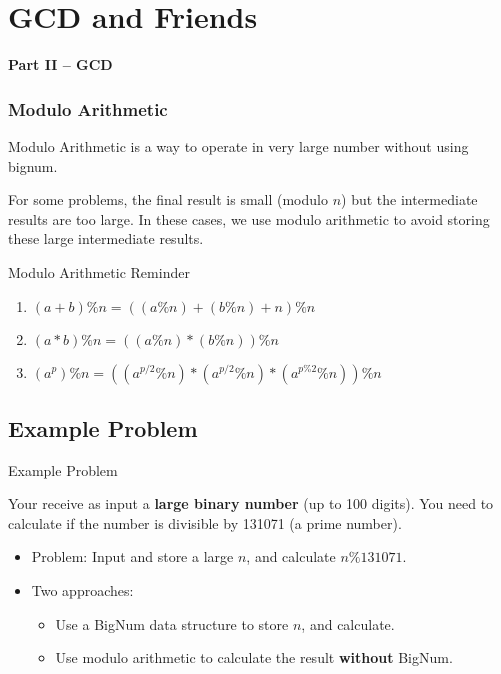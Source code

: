 
\section{GCD and Friends}
\begin{frame}
  \begin{center}
  {\bf Part II -- GCD}
  \end{center}
\end{frame}


\begin{frame}
  \frametitle{Modulo Arithmetic}

  Modulo Arithmetic is a way to operate in very large number without using bignum.\bigskip

  For some problems, the final result is small (modulo $n$) but the intermediate results are too large. In these cases, we use modulo arithmetic to avoid storing these large intermediate results.\bigskip

  \begin{block}{Modulo Arithmetic Reminder}
    \begin{enumerate}
    \item $(a+b)\%n = ((a\%n)+(b\%n)+n)\%n$
    \item $(a*b)\%n = ((a\%n)*(b\%n))\%n$
    \item $(a^p)\%n = ((a^{p/2}\%n)*(a^{p/2}\%n)*(a^{p\%2}\%n))\%n$
    \end{enumerate}
  \end{block}
\end{frame}

\subsection{Example Problem}
\begin{frame}{Example Problem}
  \begin{block}{}
    Your receive as input a {\bf large binary number} (up to 100 digits). You need to calculate if the number is divisible by 131071 (a prime number).
  \end{block}\bigskip

  \begin{itemize}
  \item Problem: Input and store a large $n$, and calculate $n\%131071$.
  \bigskip

  \item Two approaches:
  \begin{itemize}
    \item Use a BigNum data structure to store $n$, and calculate.
    \item Use modulo arithmetic to calculate the result {\bf without} BigNum.
  \end{itemize}

  \end{itemize}
\end{frame}

